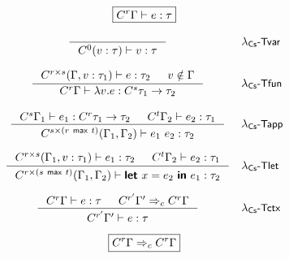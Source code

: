 \newcommand{\ctxtrans}[2]{#1 \Rightarrow_c #2}
\begin{figure*}[t]
%

\begin{equation*}
\boxed{C^{r}\Gamma \vdash e : \tau }
\end{equation*}

\begin{equation*}
\begin{array}{cl}

\inference[]
  {}
  {\ctyp{0}{(v:\tau)} \vdash v : \tau }&
\textnormal{\rulest{var}}
\\[1.8em]
\inference
  {\ctyp{r \cprd s}{(\Gamma, v:\tau_1)} \vdash e : \tau_2 & v \notin \Gamma}
  {\ctyp{r}{\Gamma} \vdash \lambda v.e : \ctyp{s}{\tau_1} \rightarrow \tau_2 }&
\textnormal{\rulest{fun}}
\\[1.8em]
\inference
  {\ctyp{s}{\Gamma_1} \vdash e_1 : \ctyp{r}{\tau_1} \rightarrow \tau_2 &
   \ctyp{t}{\Gamma_2} \vdash e_2 : \tau_1 }
  {\ctyp{s \cprd (r \cvop t)}{(\Gamma_1, \Gamma_2)} \vdash e_1~e_2 : \tau_2}&
\textnormal{\rulest{app}}
\\[1.8em]
\inference
  {\ctyp{r \cprd s}{(\Gamma_1, v:\tau_1)} \vdash e_1 : \tau_2 &
  \ctyp{t}{\Gamma_2} \vdash e_2 : \tau_1}
  {\ctyp{r \cprd (s \cvop t)}{(\Gamma_1, \Gamma_2)} \vdash \kvd{let}~x=e_2~\kvd{in}~e_1 : \tau_2}&
\textnormal{\rulest{let}}
\\[1.8em]
\inference
  {\ctyp{r}{\Gamma} \vdash e : \tau &
   \ctxtrans{\ctyp{r'}{\Gamma'}}{\ctyp{r}{\Gamma}}}
  {\ctyp{r'}{\Gamma'} \vdash e : \tau}&
\textnormal{\rulest{ctx}}
\end{array}
\end{equation*}

%
%

\begin{equation*}
\boxed{\ctxtrans{\ctyp{r}{\Gamma}}{\ctyp{r}{\Gamma}} }
\end{equation*}


\end{figure*}
